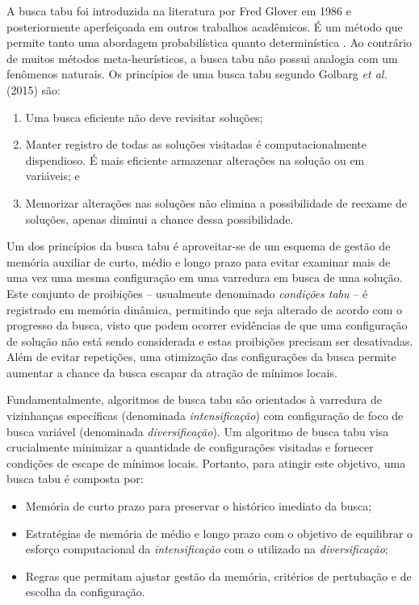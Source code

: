 A busca tabu foi introduzida na literatura por Fred Glover em 1986 \cite{GLOVER1986533} e posteriormente aperfeiçoada em outros trabalhos acadêmicos. É um método que permite tanto uma abordagem probabilística \cite{crainic1993dynamic} quanto determinística \cite{ongsakul2004unit}. Ao contrário de muitos métodos meta-heurísticos, a busca tabu não possui analogia com um fenômenos naturais. Os princípios de uma busca tabu segundo Golbarg \emph{et al.} (2015) são:
\begin{enumerate}
    \item Uma busca eficiente não deve revisitar soluções;
    \item Manter registro de todas as soluções visitadas é computacionalmente dispendioso. É mais eficiente armazenar alterações na solução ou em variáveis; e
    \item Memorizar alterações nas soluções não elimina a possibilidade de reexame de soluções, apenas diminui a chance dessa possibilidade.
\end{enumerate}

Um dos princípios da busca tabu é aproveitar-se de um esquema de gestão de memória auxiliar de curto, médio e longo prazo para evitar examinar mais de uma vez uma mesma configuração em uma varredura em busca de uma solução. Este conjunto de proibições -- usualmente denominado \emph{condições tabu} -- é registrado em memória dinâmica, permitindo que seja alterado de acordo com o progresso da busca, visto que podem ocorrer evidências de que uma configuração de solução não está sendo considerada e estas proibições precisam ser desativadas. Além de evitar repetições, uma otimização das configurações da busca permite aumentar a chance da busca escapar da atração de mínimos locais. 

Fundamentalmente, algoritmos de busca tabu são orientados à varredura de vizinhanças específicas (denominada \emph{intensificação}) com configuração de foco de busca variável (denominada \emph{diversificação}). Um algoritmo de busca tabu visa crucialmente minimizar a quantidade de configurações visitadas e fornecer condições de escape de mínimos locais. Portanto, para atingir este objetivo, uma busca tabu é composta por:

\begin{itemize}
    \item Memória de curto prazo para preservar o histórico imediato da busca;
    \item Estratégias de memória de médio e longo prazo com o objetivo de equilibrar o esforço computacional da \emph{intensificação} com o utilizado na \emph{diversificação};
    \item Regras que permitam ajustar gestão da memória, critérios de pertubação e de escolha da configuração.
\end{itemize}


